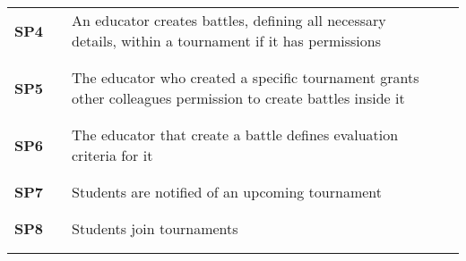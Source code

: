 \begin{longtable}[H]{l l p{8.5cm} l l}
     \textbf{SP4}              & \vline & An educator creates battles, defining all necessary details, within a tournament if it has permissions                                & \vline &                        \\
                               &        &                                                                                                                                       &        &                        \\\hline & & & & \\
     \textbf{SP5}              & \vline & The educator who created a specific tournament grants other colleagues permission to create battles inside it                         & \vline &                        \\
                               &        &                                                                                                                                       &        &                        \\\hline & & & & \\
     \textbf{SP6}              & \vline & The educator that create a battle defines evaluation criteria for it                                                                  & \vline &                        \\
                               &        &                                                                                                                                       &        &                        \\\hline & & & & \\
     \textbf{SP7}              & \vline & Students are notified of an upcoming tournament                                                                                       & \vline &                        \\
                               &        &                                                                                                                                       &        &                        \\\hline & & & & \\
     \textbf{SP8}              & \vline & Students join tournaments                                                                                                             & \vline &                        \\
                               &        &                                                                                                                                       &        &                        \\\hline & & & & \\

\end{longtable}
